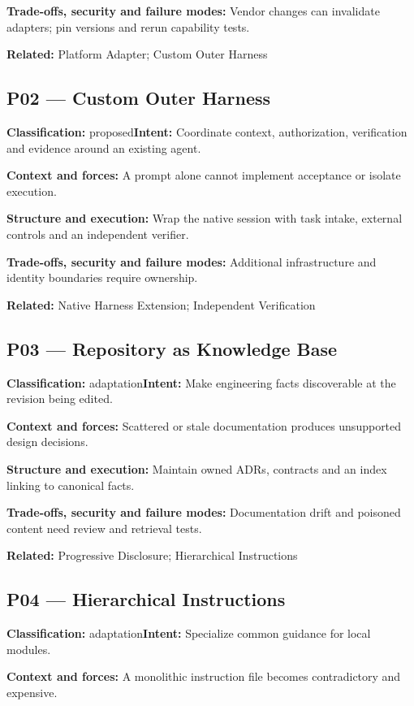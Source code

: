 \documentclass[11pt,letterpaper]{article}
\begin{document}
\textbf{Trade-offs, security and failure modes:} Vendor changes can invalidate adapters; pin versions and rerun capability tests.

\textbf{Related:} Platform Adapter; Custom Outer Harness

\subsection*{P02 --- Custom Outer Harness}
\textbf{Classification:} proposed\quad\textbf{Intent:} Coordinate context, authorization, verification and evidence around an existing agent.

\textbf{Context and forces:} A prompt alone cannot implement acceptance or isolate execution.

\textbf{Structure and execution:} Wrap the native session with task intake, external controls and an independent verifier.

\textbf{Trade-offs, security and failure modes:} Additional infrastructure and identity boundaries require ownership.

\textbf{Related:} Native Harness Extension; Independent Verification

\subsection*{P03 --- Repository as Knowledge Base}
\textbf{Classification:} adaptation\quad\textbf{Intent:} Make engineering facts discoverable at the revision being edited.

\textbf{Context and forces:} Scattered or stale documentation produces unsupported design decisions.

\textbf{Structure and execution:} Maintain owned ADRs, contracts and an index linking to canonical facts.

\textbf{Trade-offs, security and failure modes:} Documentation drift and poisoned content need review and retrieval tests.

\textbf{Related:} Progressive Disclosure; Hierarchical Instructions

\subsection*{P04 --- Hierarchical Instructions}
\textbf{Classification:} adaptation\quad\textbf{Intent:} Specialize common guidance for local modules.

\textbf{Context and forces:} A monolithic instruction file becomes contradictory and expensive.
\end{document}
